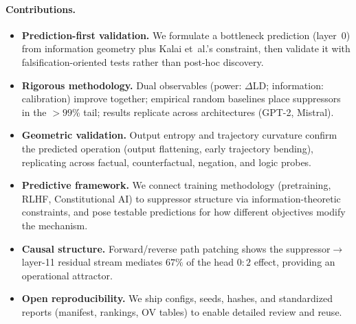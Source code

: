 \documentclass[11pt]{article}
\begin{document}
\paragraph{Contributions.}
\begin{itemize}
    \item \textbf{Prediction-first validation.} We formulate a bottleneck prediction (layer~0) from information geometry plus Kalai et~al.'s constraint, then validate it with falsification-oriented tests rather than post-hoc discovery.
    \item \textbf{Rigorous methodology.} Dual observables (power: $\Delta$LD; information: calibration) improve together; empirical random baselines place suppressors in the $>99$\% tail; results replicate across architectures (GPT-2, Mistral).
    \item \textbf{Geometric validation.} Output entropy and trajectory curvature confirm the predicted operation (output flattening, early trajectory bending), replicating across factual, counterfactual, negation, and logic probes.
    \item \textbf{Predictive framework.} We connect training methodology (pretraining, RLHF, Constitutional AI) to suppressor structure via information-theoretic constraints, and pose testable predictions for how different objectives modify the mechanism.
    \item \textbf{Causal structure.} Forward/reverse path patching shows the suppressor$\rightarrow$layer-11 residual stream mediates $67\%$ of the head $0{:}2$ effect, providing an operational attractor.
    \item \textbf{Open reproducibility.} We ship configs, seeds, hashes, and standardized reports (manifest, rankings, OV tables) to enable detailed review and reuse.
\end{itemize}















\end{document}
